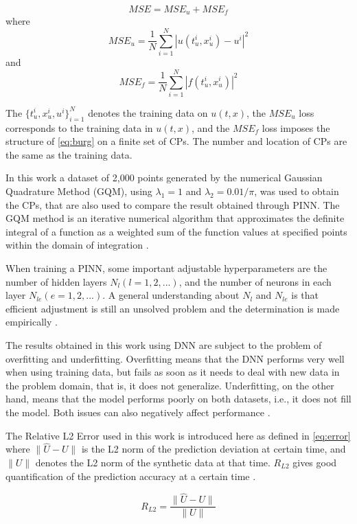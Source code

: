 \documentclass[conference]{IEEEtran}
\begin{document}
\begin{equation}\label{eq:mse}
	MSE = MSE_u + MSE_f
\end{equation}
where
$$ MSE_u = \frac{1}{N}\sum_{i=1}^{N}|u(t^i_u, x^i_u)-u^i|^2 $$
and
$$ MSE_f = \frac{1}{N}\sum_{i=1}^{N}|f(t^i_u, x^i_u)|^2 $$

The $\{t^i_u, x^i_u, u^i\}^N_{i=1}$ denotes the training data on $u(t, x)$, the $MSE_u$ loss corresponds to the training data in $u(t, x)$, and the $MSE_f$ loss imposes the structure of \autoref{eq:burg} on a finite set of CPs. The number and location of CPs are the same as the training data.

In this work a dataset of 2,000 points generated by the numerical Gaussian Quadrature Method (GQM), using $ \lambda_1 = 1 $ and $ \lambda_2 = 0.01/\pi $, was used to obtain the CPs, that are also used to compare the result obtained through PINN. The GQM method is an iterative numerical algorithm that approximates the definite integral of a function as a weighted sum of the function values at specified points within the domain of integration \cite{Burkardt2013}.

When training a PINN, some important adjustable hyperparameters are the number of hidden layers $N_l(l = 1, 2, ...)$, and the number of neurons in each layer $N_{le}(e = 1, 2, ...)$. A general understanding about $N_l$ and $N_{le}$ is that efficient adjustment is still an unsolved problem and the determination is made empirically \cite{Xu2022}.

The results obtained in this work using DNN are subject to the problem of overfitting and underfitting. Overfitting means that the DNN performs very well when using training data, but fails as soon as it needs to deal with new data in the problem domain, that is, it does not generalize. Underfitting, on the other hand, means that the model performs poorly on both datasets, i.e., it does not fill the model. Both issues can also negatively affect performance \cite{Koehrsen2018}.

The Relative L2 Error used in this work is introduced here as defined in \autoref{eq:error} where $ \| \widehat{U} - U \| $ is the L2 norm of the prediction deviation at certain time, and $\|U\|$ denotes the L2 norm of the synthetic data at that time. $R_{L2}$ gives good quantification of the prediction accuracy at a certain time \cite{Xu2022}.

\begin{equation}\label{eq:error}
R_{L2} = \frac{\| \widehat{U} - U \|}{\|U\|}
\end{equation}
\end{document}
